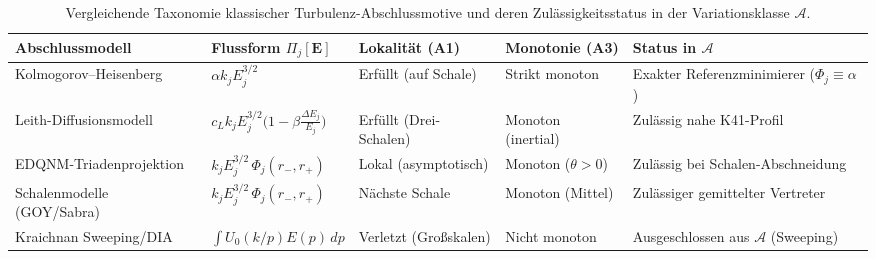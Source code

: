 \documentclass[12pt,a4paper]{article}
\theoremstyle{definition}
\theoremstyle{plain}
\theoremstyle{remark}
\begin{document}
\begin{table}[htbp]
\centering
\small
\setlength{\tabcolsep}{3.2pt}
\renewcommand{\arraystretch}{1.18}
\begin{tabular}{L{0.20\textwidth}L{0.25\textwidth}L{0.13\textwidth}L{0.13\textwidth}L{0.21\textwidth}}
\toprule
\textbf{Abschlussmodell} & \textbf{Flussform $\Pi_j[\mathbf{E}]$} & \textbf{Lokalität (A1)} & \textbf{Monotonie (A3)} & \textbf{Status in $\mathscr{A}$} \\
\midrule
Kolmogorov--\allowbreak Heisenberg & $\alpha k_j E_j^{3/2}$ & Erfüllt (auf Schale) & Strikt monoton & Exakter Referenzminimierer ($\Phi_j \equiv \alpha$) \\
\addlinespace[3pt]
Leith-Diffusionsmodell & $c_L k_j E_j^{3/2}\bigl(1 - \beta \frac{\Delta E_j}{E_j}\bigr)$ & Erfüllt (Drei-Schalen) & Monoton (inertial) & Zulässig nahe K41-Profil \\
\addlinespace[3pt]
EDQNM-Triaden\-projektion & $k_j E_j^{3/2}\,\Phi_j(r_-, r_+)$ & Lokal (asymptotisch) & Monoton ($\theta > 0$) & Zulässig bei Schalen-Abschneidung \\
\addlinespace[3pt]
Schalenmodelle (GOY/Sabra) & $k_j E_j^{3/2}\,\Phi_j(r_-, r_+)$ & Nächste Schale & Monoton (Mittel) & Zulässiger gemittelter Vertreter \\
\addlinespace[3pt]
Kraichnan Sweeping/DIA & $\int U_0(k/p) E(p)\,dp$ & Verletzt (Großskalen) & Nicht monoton & Ausgeschlossen aus $\mathscr{A}$ (Sweeping) \\
\bottomrule
\end{tabular}
\caption{Vergleichende Taxonomie klassischer Turbulenz-Abschlussmotive und deren Zulässigkeitsstatus in der Variationsklasse $\mathscr{A}$.}
\label{tab:closure-comparison}\label{tab:closure-vergleich}
\end{table}
\end{document}
